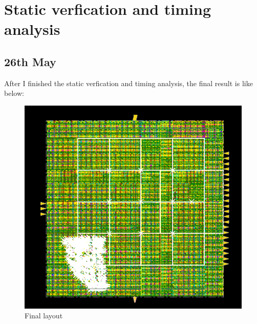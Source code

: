 \section{Static verfication and timing analysis}
\subsection{26th May}
After I finished the static verfication and timing analysis, the final result is like below:

\begin{figure}[!h]
    \centerline{\includegraphics[width=15cm]{./Figures/FinalResult}}
    \caption{Final layout\label{fig5} }
\end{figure}

%
